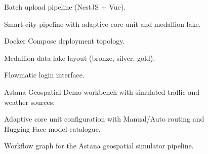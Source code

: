 
\begin{figure}[H]
  \caption{Batch upload pipeline (NestJS + Vue).}
  \label{fig:batch-upload-pipeline}
\end{figure}

\begin{figure}[H]
  \caption{Smart-city pipeline with adaptive core unit and medallion lake.}
  \label{fig:smart-city-streaming}
\end{figure}

\begin{figure}[H]
  \caption{Docker Compose deployment topology.}
  \label{fig:microservices-topology}
\end{figure}

\begin{figure}[H]
  \caption{Medallion data lake layout (bronze, silver, gold).}
  \label{fig:medallion-lake}
\end{figure}

\begin{figure}[H]
  \caption{Flowmatic login interface.}
  \label{fig:ui-login}
\end{figure}

\begin{figure}[H]
  \caption{Astana Geospatial Demo workbench with simulated traffic and weather sources.}
  \label{fig:ui-smart-city-live}
\end{figure}

\begin{figure}[H]
  \caption{Adaptive core unit configuration with Manual/Auto routing and Hugging Face model catalogue.}
  \label{fig:ui-core-unit}
\end{figure}

\begin{figure}[H]
  \caption{Workflow graph for the Astana geospatial simulator pipeline.}
  \label{fig:ui-workflow-graph}
\end{figure}

